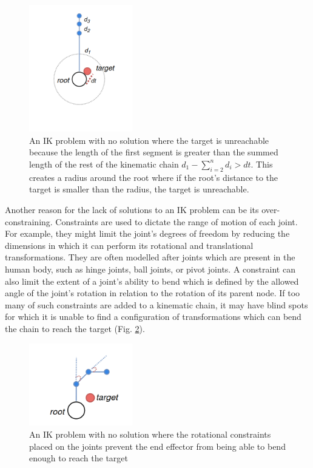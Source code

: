 \begin{figure}
    \centering
    \captionsetup{justification=centering}
    \includegraphics[width=0.4\textwidth]{grafika/unreachable_dist_2.png}
    \caption{An IK problem with no solution where the target is unreachable
    because the length of the first segment is greater than the summed length of
    the rest of the kinematic chain \(d_1 - \sum_{i=2}^{n}d_i > dt\). This creates
    a radius around the root where if the root's distance to the target is
    smaller than the radius, the target is unreachable.
} \label{fig:unreachable_dist2}
\end{figure}

Another reason for the lack of solutions to an IK problem can be its
over-constraining. Constraints are used to dictate the range of motion of
each joint. For example, they might limit the joint's degrees of freedom by
reducing the dimensions in which it can perform its rotational and translational
transformations. They are often modelled after joints which are present in the
human body, such as hinge joints, ball joints, or pivot joints. A constraint can
also limit the extent of a joint's ability to bend which is defined by the
allowed angle of the joint's rotation in relation to the rotation of its parent
node. If too many of such constraints are added to a kinematic chain, it may
have blind spots for which it is unable to find a configuration of
transformations which can bend the chain to reach the target (Fig.
\ref{fig:unreachable_angles}).

\begin{figure}
    \centering
    \captionsetup{justification=centering}
    \includegraphics[width=0.4\textwidth]{grafika/unreachable_angles.png}
    \caption{An IK problem with no solution where the rotational constraints
    placed on the joints prevent the end effector from being able to bend enough
    to reach the target}
    \label{fig:unreachable_angles}
\end{figure}

